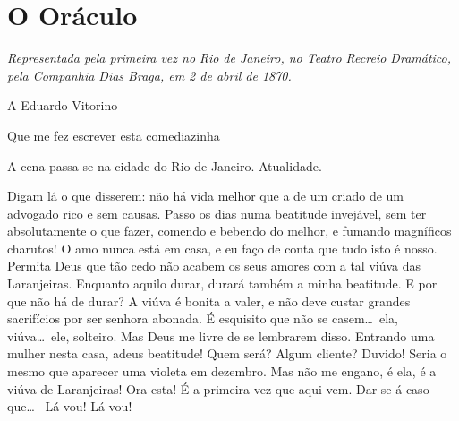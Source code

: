\chapter[O Oráculo]{O Oráculo}

\textit{Representada pela primeira vez no Rio de Janeiro, no Teatro
Recreio Dramático, pela Companhia Dias Braga,
em 2 de abril de 1870.}

\hfill A Eduardo Vitorino

\hfill Que me fez escrever esta comediazinha

\castpage


\vfil
A cena passa{}-se na cidade do Rio de Janeiro. Atualidade.

\pagebreak





   Digam lá o que disserem: não há vida
melhor que a de um criado de um advogado rico e sem causas. Passo os
dias numa beatitude invejável, sem ter absolutamente o que fazer,
comendo e bebendo do melhor, e fumando magníficos charutos! O amo nunca
está em casa, e eu faço de conta que tudo isto é nosso. Permita Deus
que tão cedo não acabem os seus amores com a tal viúva das Laranjeiras.
Enquanto aquilo durar, durará também a minha beatitude. E por que não
há de durar? A viúva é bonita a valer, e não deve custar grandes
sacrifícios por ser senhora abonada.  É
esquisito que não se casem\ldots\ ela, viúva\ldots\ ele, solteiro. Mas Deus me
livre de se lembrarem disso. Entrando uma mulher nesta casa, adeus
beatitude!  Quem será? Algum cliente? Duvido! Seria o mesmo
que aparecer uma violeta em dezembro.  Mas não me engano, é ela, é a viúva
de Laranjeiras! Ora esta! É a primeira vez que aqui vem. Dar{}-se{}-á caso
que\ldots\  Lá vou! Lá vou!

